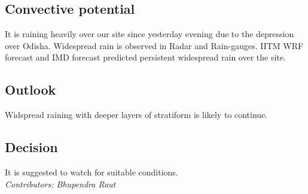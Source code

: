 \subsection*{Convective potential}
It is raining heavily over our site since yesterday evening due to the depression over Odisha. Widespread rain is observed in Radar and Rain-gauges. IITM WRF forecast and IMD forecast predicted persistent widespread rain over the site. 

\subsection*{Outlook}
Widspread raining with deeper layers of stratiform is likely to continue.\\
\subsection*{Decision}
It is suggested to watch for suitable conditions. \\ 



\textit{Contributors: Bhupendra Raut} 

